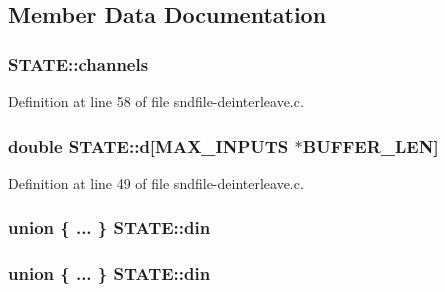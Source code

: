 \subsection{Member Data Documentation}
\subsubsection[{\texorpdfstring{channels}{channels}}]{ S\+T\+A\+T\+E\+::channels}\hypertarget{struct_s_t_a_t_e_ace13238ed4ee205fca8a96a3c1aa9297}{}\label{struct_s_t_a_t_e_ace13238ed4ee205fca8a96a3c1aa9297}


Definition at line 58 of file sndfile-\/deinterleave.\+c.

\subsubsection[{\texorpdfstring{d}{d}}]{\setlength{\rightskip}{0pt plus 5cm}double S\+T\+A\+T\+E\+::d\mbox{[}{\bf M\+A\+X\+\_\+\+I\+N\+P\+U\+TS} $\ast${\bf B\+U\+F\+F\+E\+R\+\_\+\+L\+EN}\mbox{]}}\hypertarget{struct_s_t_a_t_e_ac94f445895e6b5da656238c83324c319}{}\label{struct_s_t_a_t_e_ac94f445895e6b5da656238c83324c319}


Definition at line 49 of file sndfile-\/deinterleave.\+c.

\subsubsection[{\texorpdfstring{din}{din}}]{\setlength{\rightskip}{0pt plus 5cm}union \{ ... \}   S\+T\+A\+T\+E\+::din}\hypertarget{struct_s_t_a_t_e_a8a7a2ae7a005b9fb0f70284042892f8f}{}\label{struct_s_t_a_t_e_a8a7a2ae7a005b9fb0f70284042892f8f}
\subsubsection[{\texorpdfstring{din}{din}}]{\setlength{\rightskip}{0pt plus 5cm}union \{ ... \}   S\+T\+A\+T\+E\+::din}\hypertarget{struct_s_t_a_t_e_a7c571784adfa81442c5671f10a7f4789}{}\label{struct_s_t_a_t_e_a7c571784adfa81442c5671f10a7f4789}
